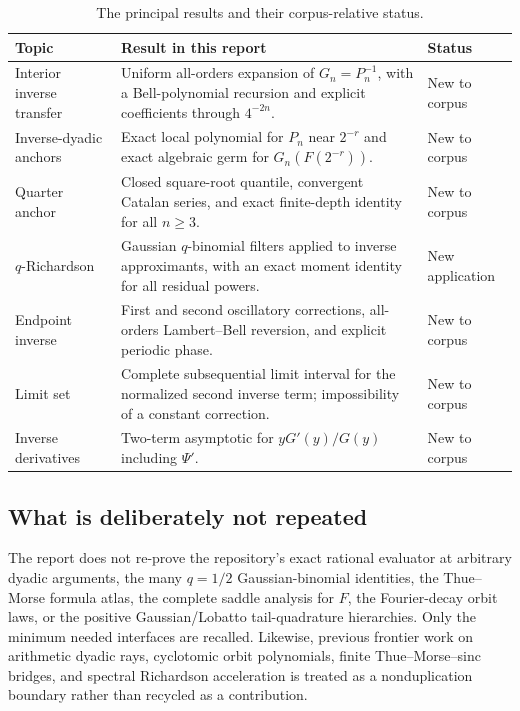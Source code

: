 \documentclass[11pt,oneside]{article}
\numberwithin{equation}{section}
\theoremstyle{definition}
\theoremstyle{remark}
\begin{document}
\begin{table}[ht]
\centering
\small
\begin{tabularx}{\textwidth}{@{}p{}X p{}@{}}
\toprule
Topic & Result in this report & Status \\
\midrule
Interior inverse transfer & Uniform all-orders expansion of $G_n=P_n^{-1}$, with a Bell-polynomial recursion and explicit coefficients through $4^{-2n}$. & New to corpus \\
Inverse-dyadic anchors & Exact local polynomial for $P_n$ near $2^{-r}$ and exact algebraic germ for $G_n(F(2^{-r}))$. & New to corpus \\
Quarter anchor & Closed square-root quantile, convergent Catalan series, and exact finite-depth identity for all $n\ge3$. & New to corpus \\
$q$-Richardson & Gaussian $q$-binomial filters applied to inverse approximants, with an exact moment identity for all residual powers. & New application \\
Endpoint inverse & First and second oscillatory corrections, all-orders Lambert--Bell reversion, and explicit periodic phase. & New to corpus \\
Limit set & Complete subsequential limit interval for the normalized second inverse term; impossibility of a constant correction. & New to corpus \\
Inverse derivatives & Two-term asymptotic for $yG'(y)/G(y)$ including $\Psi'$. & New to corpus \\
\bottomrule
\end{tabularx}
\caption{The principal results and their corpus-relative status.}
\label{tab:contribution-map}
\end{table}

\subsection{What is deliberately not repeated}

The report does not re-prove the repository's exact rational evaluator at arbitrary dyadic
arguments, the many $q=1/2$ Gaussian-binomial identities, the Thue--Morse formula atlas,
the complete saddle analysis for $F$, the Fourier-decay orbit laws, or the positive
Gaussian/Lobatto tail-quadrature hierarchies.  Only the minimum needed interfaces are recalled.
Likewise, previous frontier work on arithmetic dyadic rays, cyclotomic orbit polynomials,
finite Thue--Morse--sinc bridges, and spectral Richardson acceleration is treated as a
nonduplication boundary rather than recycled as a contribution.
\end{document}
